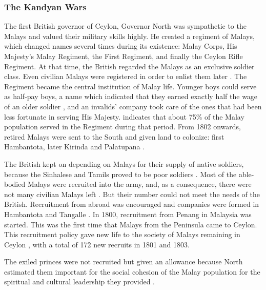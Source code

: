 \subsubsection{The Kandyan Wars}\label{sec:slmbg:TheKandyanWars}
The first British governor of Ceylon, Governor North was sympathetic to the Malays and valued their military skills highly. He created a regiment of Malays, which changed names several times during its existence: Malay Corps, His Majesty's Malay Regiment, the First Regiment, and finally the Ceylon Rifle Regiment.
At that time, the British regarded the Malays as an exclusive soldier class. Even civilian Malays were registered in order to enlist them later \citep[61]{Hussainmiya1990}.
The Regiment became the central institution of Malay life. Younger boys could serve  as half-pay boys, a name which indicated that they earned exactly half the wage of an older soldier \citep[97]{Hussainmiya1990}, and an invalids' company took care of the ones that had been less fortunate in serving His Majesty. \citet[73]{Hussainmiya1990} indicates that about 75\% of the Malay population served in the Regiment during that period. From 1802 onwards, retired Malays were sent to the South and given land to colonize: first Hambantota, later Kirinda and Palatupana \citep[63]{Hussainmiya1990}.

The British kept on depending on Malays for their supply of native soldiers, because the Sinhalese and Tamils proved to be poor soldiers \citep[24]{Hussainmiya1990}. Most of the able-bodied Malays were recruited into the army, and, as a consequence, there were not many civilian Malays left \citep[73]{Hussainmiya1990}.
But their number could not meet the needs of the British. Recruitment from abroad was encouraged and companies were formed in Hambantota and Tangalle \citep[64f]{Hussainmiya1990}. In 1800, recruitment from Penang in Malaysia was started. This was the first time that Malays from the Peninsula came to Ceylon.  This recruitment policy gave new life to the society of  Malays remaining  in Ceylon \citep[73]{Hussainmiya1990}, with a total of 172 new recruits in 1801 and 1803.

The exiled princes were not recruited but given an allowance because North estimated them important for the social cohesion of the Malay population for the spiritual and cultural leadership they provided \citep[79]{Hussainmiya1990}.


